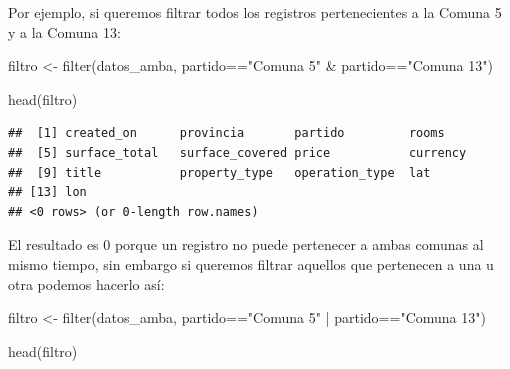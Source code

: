 \documentclass[
  spanish,
]{book}
\newenvironment{Shaded}{\begin{snugshade}}{\end{snugshade}}
\newcommand{\FunctionTok}[1]{\textcolor[rgb]{0.00,0.00,0.00}{#1}}
\newcommand{\NormalTok}[1]{#1}
\newcommand{\OtherTok}[1]{\textcolor[rgb]{0.56,0.35,0.01}{#1}}
\newcommand{\SpecialCharTok}[1]{\textcolor[rgb]{0.00,0.00,0.00}{#1}}
\newcommand{\StringTok}[1]{\textcolor[rgb]{0.31,0.60,0.02}{#1}}
\begin{document}
Por ejemplo, si queremos filtrar todos los registros pertenecientes a la Comuna 5 y a la Comuna 13:

\begin{Shaded}
\begin{Highlighting}[]
\NormalTok{filtro }\OtherTok{\textless{}{-}} \FunctionTok{filter}\NormalTok{(datos\_amba, partido}\SpecialCharTok{==}\StringTok{"Comuna 5"} \SpecialCharTok{\&}\NormalTok{ partido}\SpecialCharTok{==}\StringTok{"Comuna 13"}\NormalTok{)}

\FunctionTok{head}\NormalTok{(filtro)}
\end{Highlighting}
\end{Shaded}

\begin{verbatim}
##  [1] created_on      provincia       partido         rooms          
##  [5] surface_total   surface_covered price           currency       
##  [9] title           property_type   operation_type  lat            
## [13] lon            
## <0 rows> (or 0-length row.names)
\end{verbatim}

El resultado es 0 porque un registro no puede pertenecer a ambas comunas al mismo tiempo, sin embargo si queremos filtrar aquellos que pertenecen a una u otra podemos hacerlo así:

\begin{Shaded}
\begin{Highlighting}[]
\NormalTok{filtro }\OtherTok{\textless{}{-}} \FunctionTok{filter}\NormalTok{(datos\_amba, partido}\SpecialCharTok{==}\StringTok{"Comuna 5"} \SpecialCharTok{|}\NormalTok{ partido}\SpecialCharTok{==}\StringTok{"Comuna 13"}\NormalTok{)}

\FunctionTok{head}\NormalTok{(filtro)}
\end{Highlighting}
\end{Shaded}
\end{document}
